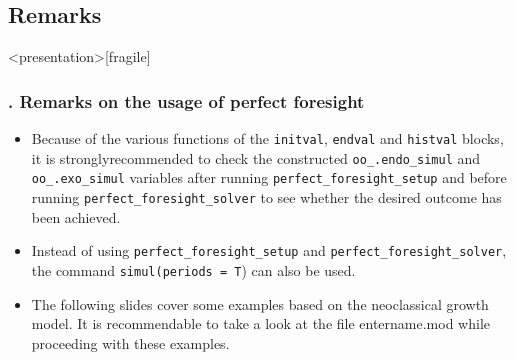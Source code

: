 \documentclass[11pt,aspectratio=169]{beamer}
\begin{document}
\subsection{Remarks}
\begin{frame}<presentation>[fragile]
	\frametitle{{\thesection.\thesubsection} Remarks on the usage of perfect foresight}
	\begin{itemize}
		\justifying
		\item  Because of the various functions of the \texttt{initval}, \texttt{endval} and \texttt{histval} blocks, it is stronglyrecommended to check the constructed \texttt{oo\_.endo\_simul} and \texttt{oo\_.exo\_simul} variables after running \texttt{perfect\_foresight\_setup} and before running \texttt{perfect\_foresight\_solver} to see whether the desired outcome has been achieved.
		\item Instead of using \texttt{perfect\_foresight\_setup} and \texttt{perfect\_foresight\_solver}, the command \texttt{simul(periods = T}) can also be used.
		\item The following slides cover some examples based on the neoclassical growth model. It is recommendable to take a look at the file entername.mod while proceeding with these examples.
	\end{itemize}
\end{frame}
\end{document}
